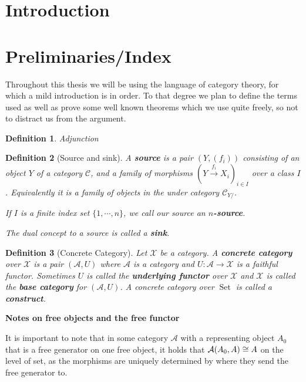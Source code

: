 \documentclass[12pt,a4paper]{article}
\newtheorem{definition}{Definition}[section] %
\DeclareMathOperator{\Set}{Set}
\def\HomA{\ensuremath\mathcal{A}}
\begin{document}
\pagestyle{fancy}
\fancyhf{}
\rfoot{\thepage}
\section{Introduction}
\section{Preliminaries/Index}

Throughout this thesis we will be using the language of category theory, for which a mild introduction is in order. To that degree we plan to define the terms used as well as prove some well known theorems which we use quite freely, so not to distract us from the argument.

\begin{definition}
	Adjunction
\end{definition}
\begin{definition}[Source and sink]
	 A \textbf{source} is a pair $(Y, (f_i))$ consisting of an object $Y$  of a category $\mathcal{C}$, and a family of morphisms $(Y \stackrel{f_i}{\to} X_i)_{i \in I}$ over a class $I$. Equivalently it is a family of objects in the under category  $\mathcal{C}_{Y/}$. 
	 
	 If $I$ is a finite index set $\{1, \cdots, n\}$, we call our source an \textbf{$n$-source}. 
	 
	 The dual concept to a source is called a \textbf{sink}. 
	 \\
\end{definition}
\begin{definition}[Concrete Category]
	Let $\mathcal{X}$ be a category. A \textbf{concrete category} over $\mathcal{X}$ is a pair $(\mathcal{A}, U)$ where $\mathcal{A}$ is a category and $U: \mathcal{A} \to \mathcal{X}$ is a faithful functor. Sometimes $U$ is called the \textbf{underlying functor} over $\mathcal{X}$ and $\mathcal{X}$ is called the \textbf{base category} for $(\mathcal{A},U)$. A concrete category over $\Set$ is called a \textbf{construct}.
\end{definition}
\textbf{Notes on free objects and the free functor}

It is important to note that in some category $\mathcal{A}$ with a representing object $A_0$ that is a free generator on one free object, it holds that $\HomA(A_0,A) \cong A$ on the level of set, as the morphisms are uniquely determined by where they send the free generator to. 
\end{document}
